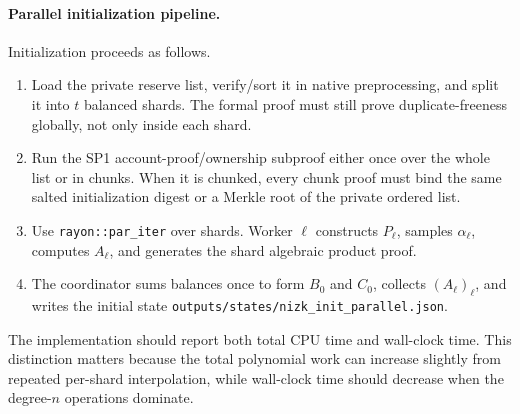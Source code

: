 \documentclass[UTF8,a4paper,11pt]{ctexart}
\begin{document}
\paragraph{Parallel initialization pipeline.}
Initialization proceeds as follows.
\begin{enumerate}[leftmargin=2em]
  \item Load the private reserve list, verify/sort it in native preprocessing, and split it into
        $t$ balanced shards.  The formal proof must still prove duplicate-freeness globally, not only
        inside each shard.
  \item Run the SP1 account-proof/ownership subproof either once over the whole list or in chunks.
        When it is chunked, every chunk proof must bind the same salted initialization digest or a
        Merkle root of the private ordered list.
  \item Use \texttt{rayon::par\_iter} over shards.  Worker $\ell$ constructs $P_\ell$, samples
        $\alpha_\ell$, computes $A_\ell$, and generates the shard algebraic product proof.
  \item The coordinator sums balances once to form $B_0$ and $C_0$, collects
        $(A_\ell)_\ell$, and writes the initial state
        \texttt{outputs/states/nizk\_init\_parallel.json}.
\end{enumerate}
The implementation should report both total CPU time and wall-clock time.  This distinction matters
because the total polynomial work can increase slightly from repeated per-shard interpolation, while
wall-clock time should decrease when the degree-$n$ operations dominate.
\end{document}
